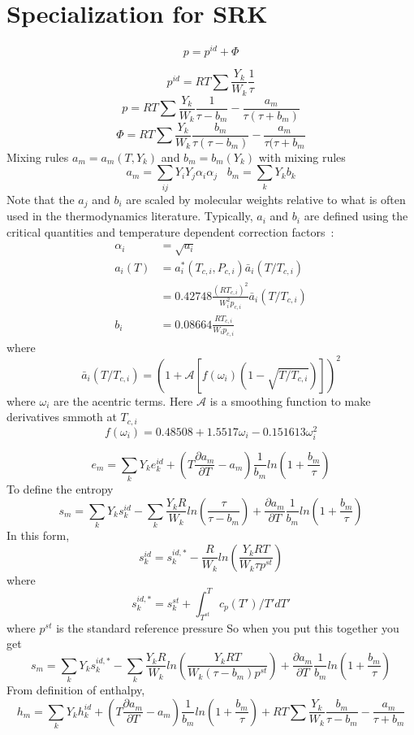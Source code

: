 \documentclass[11pt]{article}
\newcommand{\MarginPar}[1]{\marginpar{%
\vskip-\baselineskip %
\raggedright\tiny\sffamily
\hrule\smallskip{\color{red}#1}\par\smallskip\hrule}}
\newcommand{\jbb}[1]{{\bf[{\color{red}{JBB:  #1}}]}}
\begin{document}
\section{Specialization for SRK}
\label{sec:eos}


\[
p = p^{id} + \Phi
\]

\[
p^{id} = R T \sum \frac{Y_k}{W_k} \frac{1}{\tau}
\]
\[
\label{eq:pSRK}
p = R T \sum \frac{Y_k}{W_k} \frac{1}{\tau - b_m} - \frac{a_m}{\tau(\tau + b_m)}
\]
\[
\Phi
= R T \sum \frac{Y_k}{W_k} \frac{b_m}{\tau(\tau -b_m)} - \frac{a_m}{\tau (\tau + b_m}
\]
Mixing rules $a_m = a_m(T, Y_k)$ and $b_m = b_m(Y_k)$
with mixing rules
\[
a_m = \sum_{ij} Y_i Y_j \alpha_i \alpha_j \;\;\;  b_m = \sum_k Y_k b_k
\]
Note that the $a_j$ and $b_i$ are scaled by molecular weights relative to what is often used
in the thermodynamics literature.
\MarginPar{need to fix these}
Typically, $a_i$ and $b_i$ are defined using the critical quantities and temperature dependent correction factors~\cite{poling2001properties}:
\begin{align}
\alpha_i & = \sqrt{a_i} \nonumber \\
a_i(T) &= a_i^{*}\left(T_{c,i},P_{c,i}\right) \bar{a}_i (T/T_{c,i})  \nonumber \\
       &= 0.42748 \frac{\left(R T_{c,i} \right)^2}{W_i^2 p_{c,i}} \bar{a}_i \left(T/T_{c,i}\right)  \nonumber \\
 b_i &= 0.08664 \frac{R T_{c,i}}{W_i p_{c,i}}   
       \label{eq:abformEOS}
\end{align}
where
\[
\bar{a}_i (T/T_{c,i}) = \left(1 + \mathcal{A} \left[ f\left( \omega_i \right) \left(1-\sqrt{T/T_{c,i}} \right ) \right] \right)^2
\]
where $\omega_i$ are the acentric terms.
Here $\mathcal{A}$ is a smoothing function to make derivatives smmoth at $T_{c,i}$
\[
f\left( \omega_i \right) = 0.48508 + 1.5517 \omega_i - 0.151613 \omega_{i}^2
\]

\[
e_m = \sum_k Y_k e_k^{id} + \left( T  \frac{\partial a_m}{\partial T}  - a_m \right)
\frac{1}{b_m} ln ( 1 + \frac{b_m}{\tau})
\]
To define the entropy 
\begin{equation}
s_m = \sum_k Y_k s_k^{id} - 
 \sum_k \frac{Y_k R}{W_k} ln \left(\frac{\tau}{\tau-b_m} \right)
+ \frac{\partial a_m}{\partial T} \frac{1}{b_m} ln ( 1 + \frac{b_m}{\tau})
\end{equation}
In this form, 
\[
s_k^{id} = s_k^{id,*} - \frac{R}{W_k} ln(\frac{Y_k R T}{W_k \tau  p^{st}})
\]
where
\[
s_k^{id,*} = s_k^{st} + \int_{T^{st}}^T  c_p(T')/T' dT'
\]
where $p^{st}$ is the standard reference pressure
So when you put this together you get
\[
s_m = \sum_k Y_k s_k^{id,*} - \sum_k \frac{Y_k R}{W_k} ln  \left( \frac{Y_k R T}{W_k (\tau -b_m) p^{st}}   \right )
+ \frac{\partial a_m}{\partial T} \frac{1}{b_m} ln ( 1 + \frac{b_m}{\tau})
\]
From definition of enthalpy,
\[
\label{eq:hmSRK}
h_m = \sum_k Y_k h_k^{id} + \left ( T \frac{\partial a_m}{\partial T} - a_m \right)
\frac{1}{b_m} ln ( 1 + \frac{b_m}{\tau})
+ 
R T \sum \frac{Y_k}{W_k} \frac{b_m}{\tau -b_m} - \frac{a_m}{\tau + b_m}
\]
\end{document}
